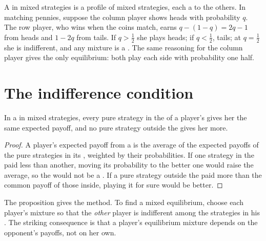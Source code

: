 A  in mixed strategies is a profile of mixed strategies, each a  to the
others. In matching pennies, suppose the column player shows heads with probability $q$. The row player, who
wins when the coins match, earns $q - (1 - q) = 2q - 1$ from heads and $1 - 2q$ from tails. If $q > \tfrac12$ she
plays heads; if $q < \tfrac12$, tails; at $q = \tfrac12$ she is indifferent, and any mixture is a . The same reasoning for the column player gives the only equilibrium: both play each side with
probability one half.

\section{The indifference condition}\label{sec:b2:mixed-strategies:indifference}

\begin{proposition}[Indifference]\label{prop:b2:mixed-strategies:indifference}
In a  in mixed strategies, every pure strategy in the  of a player's 
gives her the same expected payoff, and no pure strategy outside the  gives her more.
\end{proposition}

\begin{proof}
A player's expected payoff from a  is the average of the expected payoffs of the pure
strategies in its , weighted by their probabilities. If one strategy in the  paid less than
another, moving its probability to the better one would raise the average, so the  would not
be a . If a pure strategy outside the  paid more than the common payoff of those inside,
playing it for sure would be better.
\end{proof}

The proposition gives the method. To find a mixed equilibrium, choose each player's mixture so that the
\emph{other} player is indifferent among the strategies in his . The striking consequence is that a
player's equilibrium mixture depends on the opponent's payoffs, not on her own.

